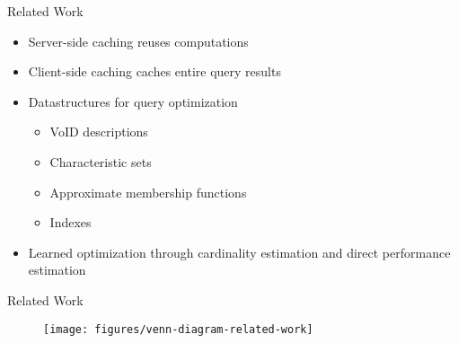 \begin{frame}{Related Work}
    \begin{overlayarea}{\textwidth}{.8\textheight}
        \begin{itemize}
            \setlength\itemsep{1em}
            \item Server-side caching reuses computations \cite{papailiou2015graph, madkour2018worq}
            \item Client-side caching caches entire query results \cite{zhang2018learning}
            \item Datastructures for query optimization
            \begin{itemize}
                \item VoID descriptions \cite{alexander2011describing}
                \item Characteristic sets \cite{neumann2011characteristic}
                \item Approximate membership functions \cite{aebeloe2019decentralized, aebeloe2022lothbrok}
                \item Indexes
            \end{itemize}
            \item Learned optimization through cardinality estimation \cite{schwabe2023cardinality} and direct performance estimation \cite{marcus2018deep}
        \end{itemize}
    \end{overlayarea}
\end{frame}


\begin{frame}{Related Work}
    \begin{figure}
        \centering
        \texttt{[image: figures/venn-diagram-related-work]}
    \end{figure}
\end{frame}

